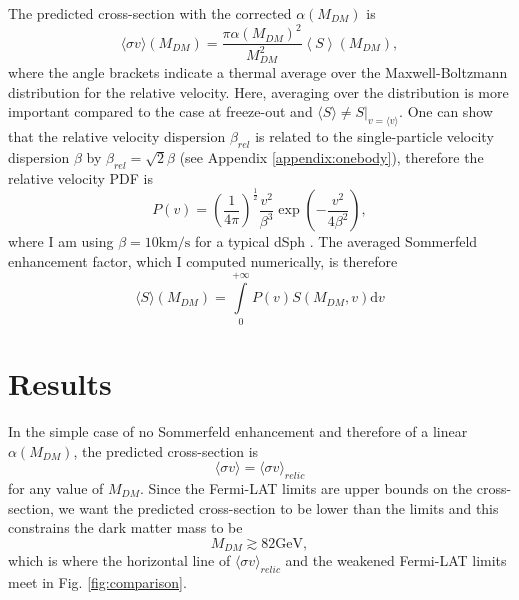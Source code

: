 The predicted cross-section with the corrected \(\alpha (M_{DM} )\) is
\begin{equation}\label{eq:sigma_enhanced}
	\langle \sigma v \rangle (M_{DM} )= \frac{\pi \alpha (M_{DM} )^2}{M_{DM} ^2} \left \langle S \right \rangle(M_{DM} ),
\end{equation}
where the angle brackets indicate a thermal average over the Maxwell-Boltzmann distribution for the relative velocity. Here, averaging over the distribution is more important compared to the case at freeze-out and \(\langle S \rangle \neq S|_{v= \langle v \rangle }\). One can show that the relative velocity dispersion \(\beta_{rel} \) is related to the single-particle velocity dispersion \(\beta \) by \(\beta _{rel} = \sqrt{2} \beta \) (see Appendix \ref{appendix:onebody}), therefore the relative velocity PDF is
\begin{equation}
	P(v ) = \left( \frac{1}{4\pi } \right)^\frac{1}{2} \frac{v ^2}{\beta ^3} \exp \left( -\frac{v ^2}{4 \beta ^2} \right),
\end{equation}
where I am using \(\beta = 10 \mathrm{km / s} \) for a typical dSph \cite{Walker_2013, Arkani_2009}.
The averaged Sommerfeld enhancement factor, which I computed numerically, is therefore
\begin{equation}
	\langle S \rangle (M_{DM} ) = \int\limits_0^{+ \infty } P(v ) S(M_{DM}, v ) \mathrm{d} v
\end{equation}


\section{Results}\label{sec:results}
In the simple case of no Sommerfeld enhancement and therefore of a linear \(\alpha (M_{DM} )\), the predicted cross-section is
\begin{equation}
	\langle \sigma v \rangle = \langle \sigma v \rangle _{relic}
\end{equation}
for any value of \(M_{DM} \). Since the Fermi-LAT limits are upper bounds on the cross-section, we want the predicted cross-section to be lower than the limits and this constrains the dark matter mass to be
\begin{equation}\label{eq:result_simple}
	M_{DM} \gtrsim 82 \mathrm{GeV}, 
\end{equation}
which is where the horizontal line of \(\langle \sigma v \rangle _{relic} \) and the weakened Fermi-LAT limits meet in Fig. \ref{fig:comparison}.

